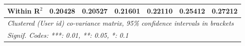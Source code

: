 \begin{table}[htbp]
\begin{threeparttable}[b]
\begin{tabular}{lcccccc}
         Within R$^2$                   & 0.20428          & 0.20527        & 0.21601        & 0.22110          & 0.25412          & 0.27212\\  
         \midrule \midrule
         \multicolumn{7}{l}{\emph{Clustered (User id) co-variance matrix, 95\% confidence intervals in brackets}}\\
         \multicolumn{7}{l}{\emph{Signif. Codes: ***: 0.01, **: 0.05, *: 0.1}}\\
      \end{tabular}
   \end{threeparttable}
\end{table}


